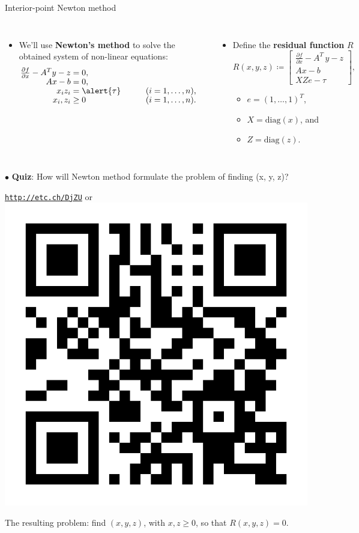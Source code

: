 %
%
\begin{frame}{Interior-point Newton method}
\vskip -10pt
\begin{columns}[t]

\begin{itemize}
\item We'll use \alert{\bf Newton's method} to solve 
the obtained system of non-linear equations:
%
\begin{alignat*}{2}
\tfrac{\partial f}{\partial x} - A^{T}y-z & =0, & \qquad\\[-4pt]
Ax-b & =0,\\[-4pt]
x_{i}z_{i} & =\alert{\tau} &  & (i=1,\ldots,n),\\[-4pt]
x_{i},z_{i} & \geq0 &  & (i=1,\ldots,n).
\end{alignat*}
%
\end{itemize}

\begin{itemize}
\item Define the \alert{\bf residual function} $R$
%
\[
R(x,y,z)\coloneqq
\begin{bmatrix}
\frac{\partial f}{\partial x} - A^{T}\,y-z\\[-2pt]
Ax-b\\[-2pt]
XZe-\tau
\end{bmatrix}, 
\]
\vskip -5pt
%
\begin{itemize}
\item $e=(1,\ldots,1)^{T}$,
\item $X=\text{diag}(x)$, and 
\item $Z=\text{diag}(z)$.
\end{itemize}
\end{itemize}
\end{columns}
\vskip 10pt
%
$\bullet$ 
\alert{\bf Quiz}: How will Newton method formulate the problem of finding (x, y, z)?
%
\begin{center}
	\href{http://etc.ch/DjZU}{\textcolor{indigo(dye)}{\tt http://etc.ch/DjZU}} \quad or \quad 
	\includegraphics[height=0.08\columnwidth]{figures/numerical-methods-chemical-equilibrium/polls.png}
\end{center}
%
\hiddenpause
\begin{tcolorbox}
	The resulting problem: find $(x,y,z)$, with $x,z\geq0$, so that $R(x,y,z)=0$.
\end{tcolorbox}

\end{frame}

